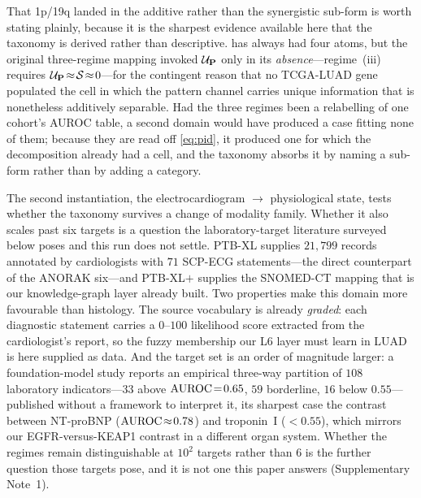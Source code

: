 That 1p/19q landed in the additive rather than the synergistic sub-form is
worth stating plainly, because it is the sharpest evidence available here that
the taxonomy is derived rather than descriptive.  has always had
four atoms, but the original three-regime mapping invoked $\mathcal{U}_{\mathbf{P}}$
only in its \emph{absence}---regime~(iii) requires
$\mathcal{U}_{\mathbf{P}}\!\approx\!\mathcal{S}\!\approx\!0$---for the contingent reason
that no TCGA-LUAD gene populated the cell in which the pattern channel carries
unique information that is nonetheless additively separable. Had the three
regimes been a relabelling of one cohort's AUROC table, a second domain would
have produced a case fitting none of them; because they are read off
\cref{eq:pid}, it produced one for which the decomposition already had a cell,
and the taxonomy absorbs it by naming a sub-form rather than by adding a
category.

\begin{table}[htbp]
\centering

\caption{Domain-B: glioma MRI\,$\rightarrow$\,genotype. IDH is
encoder-saturated (regime~(i)) and 1p/19q is an additive complementarity case
(regime~(ii-a): concat fusion recovers what neither channel captures alone) on
the TCGA-LGG cohort; a sex control is correctly Inconclusive. MGMT, scored at
full power on the $n\!=\!577$ BraTS cohort (dagger footnote), is Inconclusive
in every condition---regime~(iii).}
\label{tab:glioma_domainb}
\end{table}

The second instantiation, the electrocardiogram $\rightarrow$
physiological state, tests whether the taxonomy survives a change of
modality family. Whether it also scales past six targets is a question
the laboratory-target literature surveyed below poses and this run
does not settle.
PTB-XL supplies $21{,}799$ records annotated by cardiologists with $71$
SCP-ECG statements---the direct counterpart of the ANORAK six---and PTB-XL$+$
supplies the SNOMED-CT mapping that is our knowledge-graph layer already
built.\cite{wagner2020ptbxl,strodthoff2023ptbxlplus}
Two properties make this domain more favourable than histology. The source
vocabulary is already \emph{graded}: each diagnostic statement carries a
$0$--$100$ likelihood score extracted from the cardiologist's report, so the
fuzzy membership our L6 layer must learn in LUAD is here supplied as data.
And the target set is an order of magnitude larger: a foundation-model study
reports an empirical three-way partition of $108$ laboratory
indicators---$33$ above $\text{AUROC}\!=\!0.65$, $59$ borderline, $16$ below
$0.55$---published without a framework to interpret
it,\cite{xiao2025anyecglab} its sharpest case the contrast between NT-proBNP
($\text{AUROC}\!\approx\!0.78$) and troponin~I ($<\!0.55$), which mirrors our
EGFR-versus-KEAP1 contrast in a different organ system. Whether the regimes
remain distinguishable at $10^{2}$ targets rather than $6$ is the further
question those targets pose, and it is not one this paper answers
(Supplementary Note~1).


